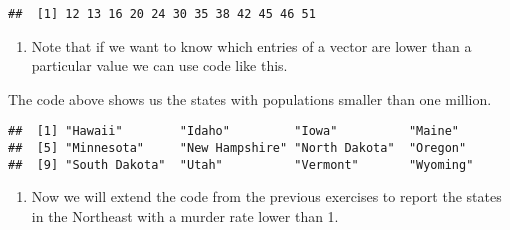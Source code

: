 \documentclass[]{article}
\newenvironment{Shaded}{\begin{snugshade}}{\end{snugshade}}
\newcommand{\CommentTok}[1]{\textcolor[rgb]{0.56,0.35,0.01}{\textit{#1}}}
\newcommand{\DecValTok}[1]{\textcolor[rgb]{0.00,0.00,0.81}{#1}}
\newcommand{\NormalTok}[1]{#1}
\newcommand{\OperatorTok}[1]{\textcolor[rgb]{0.81,0.36,0.00}{\textbf{#1}}}
\newcommand{\StringTok}[1]{\textcolor[rgb]{0.31,0.60,0.02}{#1}}
\providecommand{\tightlist}{%
  \setlength{\itemsep}{0pt}\setlength{\parskip}{0pt}}
\begin{document}
\begin{verbatim}
##  [1] 12 13 16 20 24 30 35 38 42 45 46 51
\end{verbatim}

\begin{enumerate}
\def\labelenumi{\arabic{enumi}.}
\setcounter{enumi}{2}
\tightlist
\item
  Note that if we want to know which entries of a vector are lower than
  a particular value we can use code like this.
\end{enumerate}

\begin{Shaded}
\end{Shaded}

The code above shows us the states with populations smaller than one
million.

\begin{Shaded}
\end{Shaded}

\begin{verbatim}
##  [1] "Hawaii"        "Idaho"         "Iowa"          "Maine"        
##  [5] "Minnesota"     "New Hampshire" "North Dakota"  "Oregon"       
##  [9] "South Dakota"  "Utah"          "Vermont"       "Wyoming"
\end{verbatim}

\begin{enumerate}
\def\labelenumi{\arabic{enumi}.}
\setcounter{enumi}{3}
\tightlist
\item
  Now we will extend the code from the previous exercises to report the
  states in the Northeast with a murder rate lower than 1.
\end{enumerate}
\end{document}
